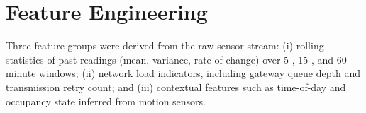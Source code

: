 \section{Feature Engineering}

Three feature groups were derived from the raw sensor stream: (i) rolling statistics of past
readings (mean, variance, rate of change) over 5-, 15-, and 60-minute windows; (ii) network load
indicators, including gateway queue depth and transmission retry count; and (iii) contextual
features such as time-of-day and occupancy state inferred from motion sensors.
